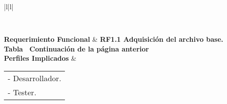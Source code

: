 \begin{longtable}{|l|l|}
\caption{Prueba unitaria RF1.1}
\label{PU_RF1_1}\\
\hline

\textbf{Requerimiento Funcional}                                                       & \textbf{RF1.1 Adquisición del archivo base.}                                                                                                                                                                                                                                                                                                                                                                                                                                                                                                                                                                                                                                                     \\ \hline
\endfirsthead
%
%
{{\bfseries Tabla \thetable\ Continuación de la página anterior}} \\
\endhead
%
\textbf{Perfiles Implicados}                                                           & \begin{tabular}[c]{@{}l@{}}- Desarrollador.\\ - Tester.\end{tabular}                                                                                                                                                                                                                                                                                                                                                                                                                                                                                                                                                                                                                             \\ \hline

\end{longtable}
